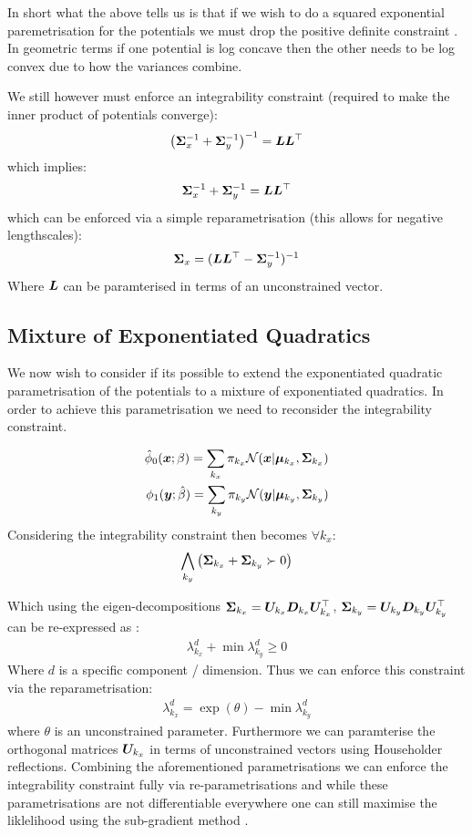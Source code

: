 \documentclass[a4paper,12pt,twoside,openright]{report}
\theoremstyle{definition}
\begin{document}
In short what the above tells us is that if we wish to do a squared exponential paremetrisation for the potentials we must drop the positive definite constraint . In geometric terms if one potential is log concave then the other needs to be log convex due to how the variances combine.

We still however must enforce an integrability constraint (required to make the inner product of potentials converge):
\begin{align*}
\left({\bm{\Sigma}}_x^{-1} +{\bm{\Sigma}}_y^{-1}\right)^{-1} = {\bm{L}}{\bm{L}}^{\top}
\end{align*}
which implies:
\begin{align*}
{\bm{\Sigma}}_x^{-1} +{\bm{\Sigma}}_y^{-1} = {\bm{L}}{\bm{L}}^{\top}
\end{align*}
which can be enforced via a simple reparametrisation (this allows for negative lengthscales):
\begin{align*}
{\bm{\Sigma}}_x = ({\bm{L}}{\bm{L}}^{\top} -{\bm{\Sigma}}_y^{-1})^{-1}
\end{align*}
Where ${\bm{L}}$ can be paramterised in terms of an unconstrained vector.
\subsection{Mixture of Exponentiated Quadratics}


We now wish to consider if its possible to extend the exponentiated quadratic  parametrisation of the potentials to a mixture of exponentiated quadratics. In order to achieve this parametrisation we need to reconsider the integrability constraint.

\begin{align}
{\hat{\phi}}_0( {\bm{x}} ; \beta) =  \sum_{k_x} \pi_{k_x} {\mathcal{N}}({\bm{x}} | {\bm{\mu}}_{k_x}, {\bm{\Sigma}}_{k_x}) \\
\phi_1( {\bm{y}} ; \hat{\beta}) = \sum_{k_y} \pi_{k_y}  {\mathcal{N}}({\bm{y}} | {\bm{\mu}}_{k_y}, {\bm{\Sigma}}_{k_y}) 
\end{align}
Considering  the integrability constraint then becomes $\forall k_x$:
\begin{align*}
   \bigwedge_{k_y} \left({\bm{\Sigma}}_{k_x} +{\bm{\Sigma}}_{k_y} \succ 0\right) 
\end{align*}

Which using the eigen-decompositions ${\bm{\Sigma}}_{k_x}={\bm{U}}_{k_x} {\bm{D}}_{k_x} {\bm{U}}^{\top}_{k_x}$,  ${\bm{\Sigma}}_{k_y}={\bm{U}}_{k_y} {\bm{D}}_{k_y} {\bm{U}}^{\top}_{k_y}$ can be re-expressed as : 
\begin{align*}
  \lambda_{k_x}^d + \min\lambda_{k_y}^d \geq 0 
\end{align*}
Where $d$ is a specific component / dimension. Thus we can enforce this constraint via the reparametrisation:
\begin{align*}
   \lambda_{k_x}^d = \exp(\theta) - \min\lambda_{k_y}^d 
\end{align*}
where  $\theta$ is an unconstrained parameter. Furthermore we can paramterise the orthogonal matrices ${\bm{U}}_{k_x}$ in terms of unconstrained vectors using Householder reflections. Combining the aforementioned parametrisations we can enforce the integrability constraint  fully via re-parametrisations and while these parametrisations are not differentiable everywhere one can still maximise the liklelihood using the sub-gradient method \citep{shor1991development}.
\end{document}
